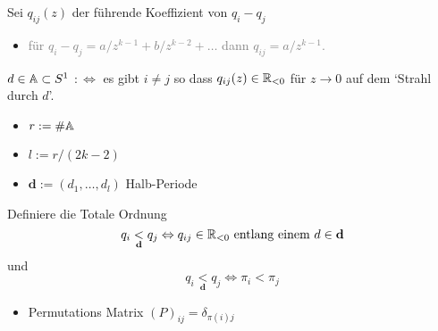 \begin{defn}
  Sei $q_{ij}(z)$ der führende Koeffizient von $q_i-q_j$
  \begin{itemize}
    \item \textcolor{gray}{für $q_i-q_j=a/z^{k-1}+b/z^{k-2}+\dots$ dann
      $q_{ij}=a/z^{k-1}$.}
  \end{itemize}
  $d\in\mathbb{A}\subset S^1$
  $:\Leftrightarrow{}$
  es gibt $i\neq j$ so dass $q_{ij}(z)\in\mathbb{R}_{<0}$ für $z\to0$ auf dem `Strahl
  durch $d$'.
\end{defn}
\begin{paracol}{2}
  \begin{defn}
    \begin{itemize}
      \item $r:=\#\mathbb{A}$
      \item $l:=r/(2k-2)$
      \item $\textbf{d}:=(d_1,\dots,d_l)$ Halb-Periode
    \end{itemize}
  \end{defn}
  Definiere die Totale Ordnung
  \[
    q_i\underset{\textbf{d}}{<}q_j\Leftrightarrow{}q_{ij}\in\mathbb{R}_{<0}\text{
    entlang einem } d\in\textbf{d}
  \]
  und
  \[
    q_i\underset{\textbf{d}}{<}q_j\Leftrightarrow{}\pi_i<\pi_j
  \]
  \begin{itemize}
    \item Permutations Matrix $(P)_{ij}=\delta_{\pi(i)j}$
  \end{itemize}
\switchcolumn
  \begin{center}
\end{center}
\end{paracol}

